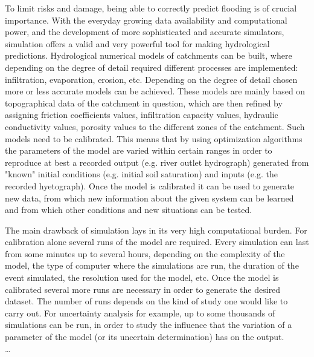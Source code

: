 To limit risks and damage, being able to correctly predict flooding is of crucial importance.
With the everyday growing data availability and computational power, and the development of more sophisticated and accurate simulators, simulation offers a valid and very powerful tool for making hydrological predictions.
Hydrological numerical models of catchments can be built, where depending on the degree of detail required different processes are implemented: infiltration, evaporation, erosion, etc.
Depending on the degree of detail chosen more or less accurate models can be achieved.
These models are mainly based on topographical data of the catchment in question, which are then refined by assigning friction coefficients values, infiltration capacity values, hydraulic conductivity values, porosity values to the different zones of the catchment.
Such models need to be calibrated.
This means that by using optimization algorithms the parameters of the model are varied within certain ranges in order to reproduce at best a recorded output (e.g. river outlet hydrograph) generated from "known" initial conditions (e.g. initial soil saturation) and inputs (e.g. the recorded hyetograph).
Once the model is calibrated it can be used to generate new data, from which new information about the given system can be learned and from which other conditions and new situations can be tested.

The main drawback of simulation lays in its very high computational burden.
For calibration alone several runs of the model are required.
Every simulation can last from some minutes up to several hours, depending on the complexity of the model, the type of computer where the simulations are run, the duration of the event simulated, the resolution used for the model, etc.
Once the model is calibrated several more runs are necessary in order to generate the desired dataset.
The number of runs depends on the kind of study one would like to carry out.
For uncertainty analysis for example, up to some thousands of simulations can be run, in order to study the influence that the variation of a parameter of the model (or its uncertain determination) has on the output.\\

\ldots\\




